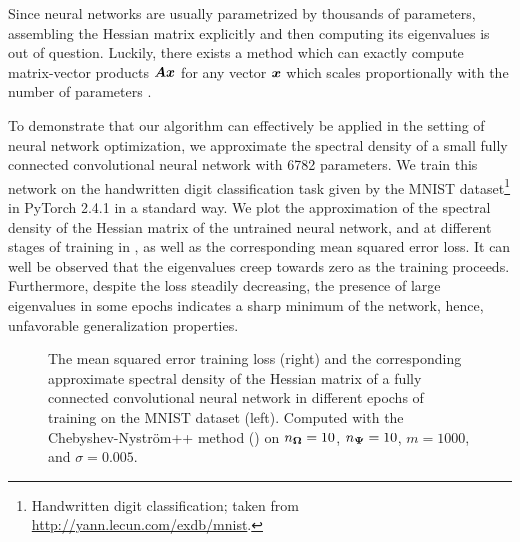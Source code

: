 Since neural networks are usually parametrized by thousands of parameters, assembling the Hessian matrix explicitly and then computing its eigenvalues is out of question. Luckily, there exists a method which can exactly compute matrix-vector products $\boldsymbol{A} \boldsymbol{x}$ for any vector $\boldsymbol{x}$ which scales proportionally with the number of parameters \cite{pearlmutter-1994-fast-exact}.

To demonstrate that our algorithm can effectively be applied in the setting of neural network optimization, we approximate the spectral density of a small fully connected convolutional neural network with 6782 parameters. We train this network on the handwritten digit classification task given by the MNIST dataset\footnote{Handwritten digit classification; taken from \url{http://yann.lecun.com/exdb/mnist}.} in PyTorch 2.4.1 in a standard way. We plot the approximation of the spectral density of the Hessian matrix of the untrained neural network, and at different stages of training in , as well as the corresponding mean squared error loss. It can well be observed that the eigenvalues creep towards zero as the training proceeds. Furthermore, despite the loss steadily decreasing, the presence of large eigenvalues in some epochs indicates a sharp minimum of the network, hence, unfavorable generalization properties.

\begin{figure}
    \begin{minipage}[c]{.49\linewidth}
        \centering
        
    \end{minipage}\hfill%
    \begin{minipage}[c]{.49\linewidth}
        \centering
        
    \end{minipage}
    \caption{The mean squared error training loss (right) and the corresponding approximate spectral density of the Hessian matrix of a fully connected convolutional neural network in different epochs of training on the MNIST dataset (left). Computed with the Chebyshev-Nyström++ method () on $n_{\boldsymbol{\Omega}} = 10$, $n_{\boldsymbol{\Psi}} = 10$, $m = 1000$, and $\sigma = 0.005$.}
    \label{fig:hessian-density}
\end{figure}
